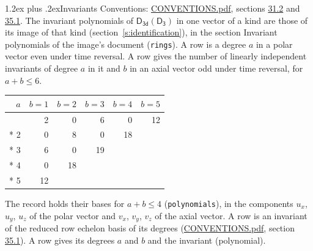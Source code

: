 \documentclass[10pt,a4paper]{article}
\makeatletter
\renewcommand\section{\@startsection{section}{1}{\z@}{-3ex plus -1ex minus -.2ex}%
  {1.2ex plus .2ex}{\normalfont\large\sffamily\bfseries\color{parttitle}}}
\numberwithin{equation}{section}
\newcommand{\grp}[1]{\mathsf{#1}}
\makeatother
\begin{document}
\section{Invariants}\label{s:invariants}
Conventions: \href{../../CONVENTIONS.pdf}{CONVENTIONS.pdf}, sections \href{../../CONVENTIONS.pdf\#conv.31.2}{31.2} and \href{../../CONVENTIONS.pdf\#conv.35.1}{35.1}.
The invariant polynomials of $\grp{D_{3d}}(\grp{D_{3}})$ in one vector of a kind are those of its image of that kind (section~\ref{s:identification}), in the section Invariant polynomials of the image's document (\texttt{rings}).
\leavevmode\label{n:index.degree.polar}\label{n:index.degree.axial}A row is a degree $a$ in a polar vector even under time reversal. A row gives the number of linearly independent invariants of degree $a$ in it and $b$ in an axial vector odd under time reversal, for $a + b \le 6$.
{\small\begin{longtable}{@{}rrrrrr@{}}\toprule
$a$ & $b = 1$ & $b = 2$ & $b = 3$ & $b = 4$ & $b = 5$\\\midrule\endhead
\bottomrule\endfoot\endlastfoot
1 & 2 & 0 & 6 & 0 & 12\\*
2 & 0 & 8 & 0 & 18 & \\*
3 & 6 & 0 & 19 &  & \\*
4 & 0 & 18 &  &  & \\*
5 & 12 &  &  &  & \\
\bottomrule\end{longtable}}
\leavevmode\label{n:local.component.polar}\label{n:local.component.axial}The record holds their bases for $a + b \le 4$ (\texttt{polynomials}), in the components $u_{x}$, $u_{y}$, $u_{z}$ of the polar vector and $v_{x}$, $v_{y}$, $v_{z}$ of the axial vector. \label{n:head.polynomial}A row is an invariant of the reduced row echelon basis of its degrees (\href{../../CONVENTIONS.pdf}{CONVENTIONS.pdf}, section \href{../../CONVENTIONS.pdf\#conv.35.1}{35.1}). A row gives its degrees $a$ and $b$ and the invariant (polynomial).
\end{document}
